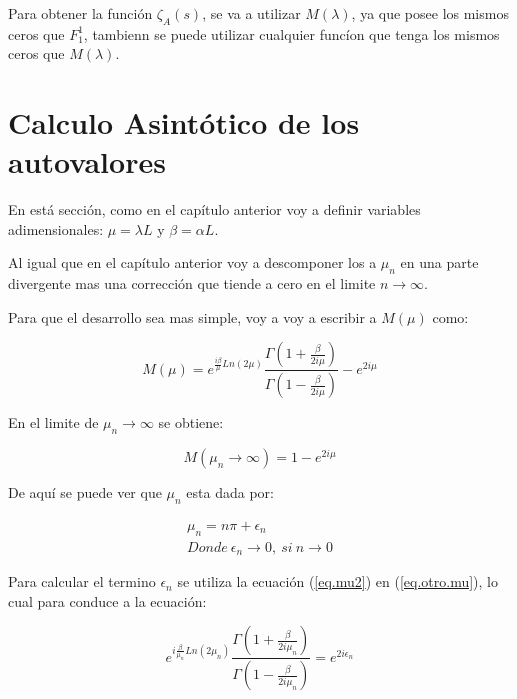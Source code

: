 Para obtener la función $\zeta _A (s) $, se va a utilizar $M( \lambda)$, ya que posee los mismos ceros que $F _1 ^1$, tambienn se puede utilizar cualquier funcíon que tenga los mismos ceros que $M ( \lambda )$.





\section{Calculo Asintótico de los autovalores}


En está sección, como en el capítulo anterior voy a definir variables adimensionales: $\mu = \lambda L $ y $\beta = \alpha L$.

Al igual que en el capítulo anterior voy a descomponer los a $\mu _n$ en una parte divergente mas una corrección que tiende a cero en el limite $n \rightarrow \infty$.

Para que el desarrollo sea mas simple, voy a voy a escribir a $M (\mu)$ como:

\begin{equation}
M (\mu) = e ^{\frac{i \beta }{\mu} Ln(2 \mu) }
\frac{\Gamma (1 + \frac{ \beta}{2 i \mu})}{\Gamma (1 - \frac{ \beta}{2 i \mu})}
- e ^{2 i \mu}
\label{eq.otro.mu}
\end{equation}


En el limite de $\mu _n \rightarrow \infty$ se obtiene:

\begin{equation}
    M(\mu _n \rightarrow \infty) = 
	1 - e ^{2 i \mu}
\end{equation}

De aquí se puede ver que $\mu _n$ esta dada por:


\begin{equation}
\begin{array}{c}
    \mu _n = n \pi + \epsilon _n \\
    Donde \ \epsilon _n \rightarrow{0} ,\ si \ n \rightarrow{0}
\end{array}
\label{eq.mu2}
\end{equation}



Para calcular el termino $\epsilon _n$ se utiliza la ecuación (\ref{eq.mu2}) en (\ref{eq.otro.mu}), lo cual para conduce a la ecuación:

\begin{equation}
	e ^{ i \frac{\beta}{ \mu _n} Ln(2 \mu _n)}     
    \frac{\Gamma(1 + \frac{ \beta}{2  i \mu _n} ) }
    {\Gamma(1 -  \frac{ \beta}{2  i \mu _n} )} =    
    e ^{2 i \epsilon _n }
\end{equation}

